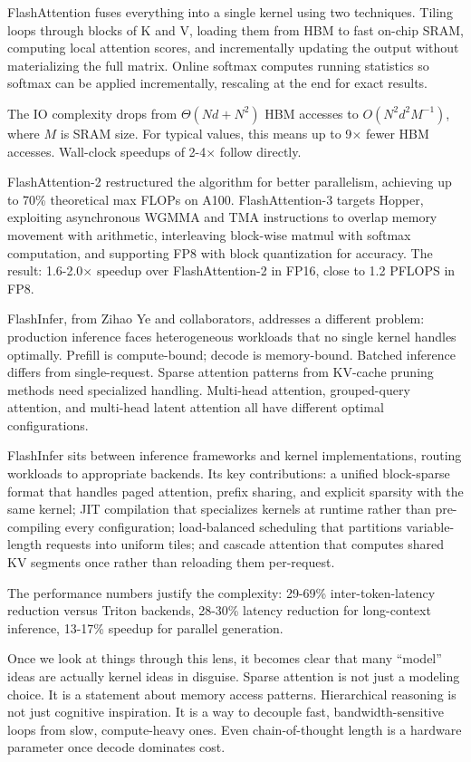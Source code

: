 \documentclass[12pt]{article}
\begin{document}
FlashAttention fuses everything into a single kernel using two techniques. Tiling loops through blocks of K and V, loading them from HBM to fast on-chip SRAM, computing local attention scores, and incrementally updating the output without materializing the full matrix. Online softmax computes running statistics so softmax can be applied incrementally, rescaling at the end for exact results.

The IO complexity drops from $\Theta(Nd + N^2)$ HBM accesses to $O(N^2d^2M^{-1})$, where $M$ is SRAM size. For typical values, this means up to 9$\times$ fewer HBM accesses. Wall-clock speedups of 2-4$\times$ follow directly.

FlashAttention-2 restructured the algorithm for better parallelism, achieving up to 70\% theoretical max FLOPs on A100. FlashAttention-3 targets Hopper, exploiting asynchronous WGMMA and TMA instructions to overlap memory movement with arithmetic, interleaving block-wise matmul with softmax computation, and supporting FP8 with block quantization for accuracy. The result: 1.6-2.0$\times$ speedup over FlashAttention-2 in FP16, close to 1.2 PFLOPS in FP8.

FlashInfer, from Zihao Ye and collaborators, addresses a different problem: production inference faces heterogeneous workloads that no single kernel handles optimally. Prefill is compute-bound; decode is memory-bound. Batched inference differs from single-request. Sparse attention patterns from KV-cache pruning methods need specialized handling. Multi-head attention, grouped-query attention, and multi-head latent attention all have different optimal configurations.

FlashInfer sits between inference frameworks and kernel implementations, routing workloads to appropriate backends. Its key contributions: a unified block-sparse format that handles paged attention, prefix sharing, and explicit sparsity with the same kernel; JIT compilation that specializes kernels at runtime rather than pre-compiling every configuration; load-balanced scheduling that partitions variable-length requests into uniform tiles; and cascade attention that computes shared KV segments once rather than reloading them per-request.

The performance numbers justify the complexity: 29-69\% inter-token-latency reduction versus Triton backends, 28-30\% latency reduction for long-context inference, 13-17\% speedup for parallel generation.

Once we look at things through this lens, it becomes clear that many ``model'' ideas are actually kernel ideas in disguise. Sparse attention is not just a modeling choice. It is a statement about memory access patterns. Hierarchical reasoning is not just cognitive inspiration. It is a way to decouple fast, bandwidth-sensitive loops from slow, compute-heavy ones. Even chain-of-thought length is a hardware parameter once decode dominates cost.
\end{document}
